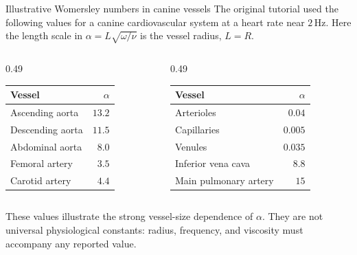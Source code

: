 \documentclass[aspectratio=169,11pt]{beamer}
\begin{document}
\begin{frame}{Illustrative Womersley numbers in canine vessels}
The original tutorial used the following values for a canine cardiovascular system at a heart rate near $2\,\mathrm{Hz}$. Here the length scale in $\alpha=L\sqrt{\omega/\nu}$ is the vessel radius, $L=R$.
\begin{columns}[T,onlytextwidth]
\begin{column}{0.49\textwidth}
\begin{center}
\renewcommand{\arraystretch}{1.16}
\begin{tabular}{lr}
\toprule
Vessel & $\alpha$ \\
\midrule
Ascending aorta & $13.2$ \\
Descending aorta & $11.5$ \\
Abdominal aorta & $8.0$ \\
Femoral artery & $3.5$ \\
Carotid artery & $4.4$ \\
\bottomrule
\end{tabular}
\end{center}
\end{column}
\begin{column}{0.49\textwidth}
\begin{center}
\renewcommand{\arraystretch}{1.16}
\begin{tabular}{lr}
\toprule
Vessel & $\alpha$ \\
\midrule
Arterioles & $0.04$ \\
Capillaries & $0.005$ \\
Venules & $0.035$ \\
Inferior vena cava & $8.8$ \\
Main pulmonary artery & $15$ \\
\bottomrule
\end{tabular}
\end{center}
\end{column}
\end{columns}
\begin{punchbox}
\small These values illustrate the strong vessel-size dependence of $\alpha$. They are not universal physiological constants: radius, frequency, and viscosity must accompany any reported value.
\end{punchbox}
\end{frame}
\end{document}
